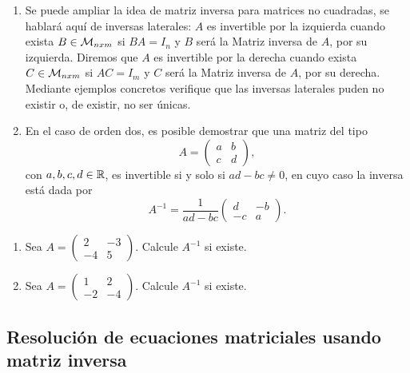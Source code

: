 \begin{rmk}
\begin{enumerate}
    \item Se puede ampliar la idea de matriz inversa para matrices no cuadradas, se
hablará aquí de inversas laterales: $A$ es invertible por la izquierda cuando exista $B \in
\mathcal{M}_{n x m}$ si $BA = I_n$ y $B$ será la Matriz inversa de $A$, por su izquierda. Diremos que $A$ es invertible por la derecha cuando exista $C \in
\mathcal{M}_{n x m}$ si $AC = I_m$ y $C$ será la Matriz inversa de $A$, por su derecha.
Mediante ejemplos concretos verifique que las inversas laterales puden no existir
o, de existir, no ser únicas.


\item En el caso de orden dos, es posible demostrar que una matriz del tipo
\[A=\begin{pmatrix}  a & b \\ c & d \end{pmatrix},\]
con $a, b,c,d \in \mathbb{R}$, es invertible si y solo si $ad-bc\neq 0$, en cuyo caso la inversa est\'a dada por
\[A^{-1}=\frac{1}{ad-bc}\begin{pmatrix}  d & -b \\ -c & a \end{pmatrix}.\]
\end{enumerate}
\end{rmk}

\begin{ejer}
\begin{enumerate}
\item
Sea $A = \begin{pmatrix}  2 & -3 \\ -4 & 5 \end{pmatrix}$. Calcule $A^{-1}$ si existe.

\item
Sea $A = \begin{pmatrix}  1 & 2 \\ -2 & -4 \end{pmatrix}$. Calcule $A^{-1}$ si existe.
\end{enumerate}
\end{ejer}
\vspace*{2cm}
\subsection{Resoluci\'on de ecuaciones matriciales usando matriz inversa}


